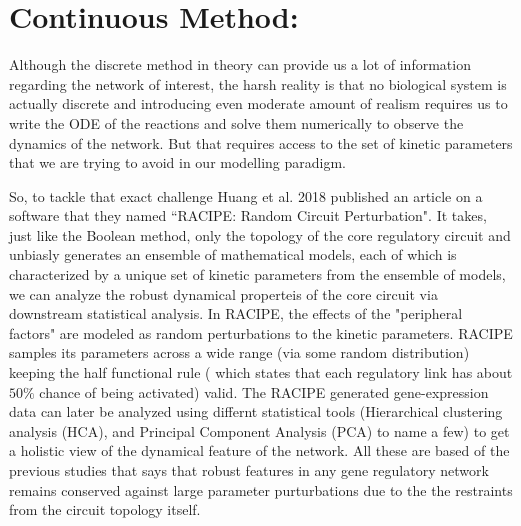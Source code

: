 \documentclass{article}
\begin{document}
\section*{Continuous Method:} Although the discrete method in theory can provide
us a lot of information regarding the network of interest, the harsh reality 
is that no biological system is actually discrete and introducing even moderate
amount of realism requires us to write the ODE of the reactions and solve 
them numerically to observe the dynamics of the network. But that requires 
access to the set of kinetic parameters that we are trying to avoid in our 
modelling paradigm. 

So, to tackle that exact challenge Huang et al. 2018 \cite{RACIPE} published 
an article on a software that they named ``RACIPE: Random Circuit Perturbation".
It takes, just like the Boolean method, only the topology of the core regulatory
circuit and unbiasly generates an ensemble of mathematical models, each of which 
is characterized by a unique set of kinetic parameters from the ensemble of 
models, we can analyze the robust dynamical properteis of the core circuit via 
downstream statistical analysis. In RACIPE, the effects of the "peripheral 
factors" are modeled as random perturbations to the kinetic parameters. RACIPE
samples its parameters across a wide range (via some random distribution) 
keeping the half functional rule (
which states that each regulatory link has about $50\%$ chance of being activated)
valid. The RACIPE generated gene-expression data can later be analyzed using 
differnt statistical tools (Hierarchical clustering analysis (HCA), 
and Principal Component Analysis (PCA) to name a few) to get a holistic view of the dynamical 
feature of the network. All these are based of the previous studies that says 
that robust features in any gene regulatory network remains conserved against
large parameter purturbations due to the the restraints from the circuit 
topology itself. 
\end{document}
